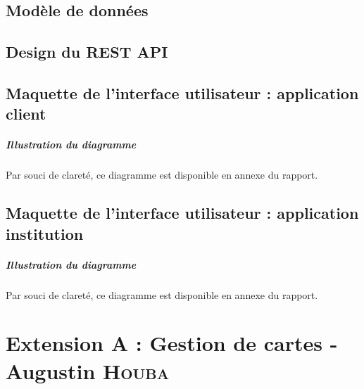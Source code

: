 \documentclass[]{report}
\begin{document}
\section{Modèle de données}


\newpage


\section{Design du REST API}


\newpage


\section{Maquette de l'interface utilisateur : application client}



\vspace*{\fill}

\paragraph{Illustration du diagramme} Par souci de clareté, ce diagramme est disponible en annexe du rapport.

\newpage



\section{Maquette de l'interface utilisateur : application institution}



\vspace*{\fill}

\paragraph{Illustration du diagramme} Par souci de clareté, ce diagramme est disponible en annexe du rapport.

\newpage





\chapter{Extension A : Gestion de cartes - Augustin \textsc{Houba}}


\newpage
\end{document}
